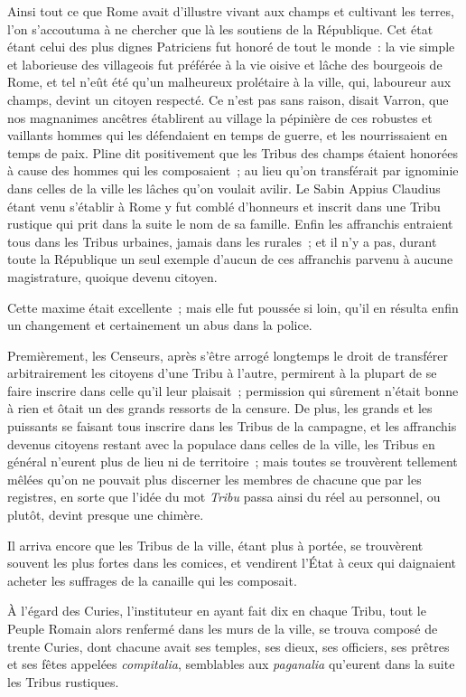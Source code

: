 \documentclass[french,twoside]{book} %
\begin{document}
Ainsi tout ce que Rome avait d’illustre vivant aux champs et cultivant les terres, l’on s’accoutuma à ne chercher que là les soutiens de la République. Cet état étant celui des plus dignes Patriciens fut honoré de tout le monde : la vie simple et laborieuse des villageois fut préférée à la vie oisive et lâche des bourgeois de Rome, et tel n’eût été qu’un malheureux prolétaire à la ville, qui, laboureur aux champs, devint un citoyen respecté. Ce n’est pas sans raison, disait Varron, que nos magnanimes ancêtres établirent au village la pépinière de ces robustes et vaillants hommes qui les défendaient en temps de guerre, et les nourrissaient en temps de paix. Pline dit positivement que les Tribus des champs étaient honorées à cause des hommes qui les composaient ; au lieu qu’on transférait par ignominie dans celles de la ville les lâches qu’on voulait avilir. Le Sabin Appius Claudius étant venu s’établir à Rome y fut comblé d’honneurs et inscrit dans une Tribu rustique qui prit dans la suite le nom de sa famille. Enfin les affranchis entraient tous dans les Tribus urbaines, jamais dans les rurales ; et il n’y a pas, durant toute la République un seul exemple d’aucun de ces affranchis parvenu à aucune magistrature, quoique devenu citoyen.\par
Cette maxime était excellente ; mais elle fut poussée si loin, qu’il en résulta enfin un changement et certainement un abus dans la police.\par
Premièrement, les Censeurs, après s’être arrogé longtemps le droit de transférer arbitrairement les citoyens d’une Tribu à l’autre, permirent à la plupart de se faire inscrire dans celle qu’il leur plaisait ; permission qui sûrement n’était bonne à rien et ôtait un des grands ressorts de la censure. De plus, les grands et les puissants se faisant tous inscrire dans les Tribus de la campagne, et les affranchis devenus citoyens restant avec la populace dans celles de la ville, les Tribus en général n’eurent plus de lieu ni de territoire ; mais toutes se trouvèrent tellement mêlées qu’on ne pouvait plus discerner les membres de chacune que par les registres, en sorte que l’idée du mot {\itshape Tribu} passa ainsi du réel au personnel, ou plutôt, devint presque une chimère.\par
Il arriva encore que les Tribus de la ville, étant plus à portée, se trouvèrent souvent les plus fortes dans les comices, et vendirent l’État à ceux qui daignaient acheter les suffrages de la canaille qui les composait.\par
À l’égard des Curies, l’instituteur en ayant fait dix en chaque Tribu, tout le Peuple Romain alors renfermé dans les murs de la ville, se trouva composé de trente Curies, dont chacune avait ses temples, ses dieux, ses officiers, ses prêtres et ses fêtes appelées {\itshape compitalia}, semblables aux {\itshape paganalia} qu’eurent dans la suite les Tribus rustiques.\par
\end{document}
